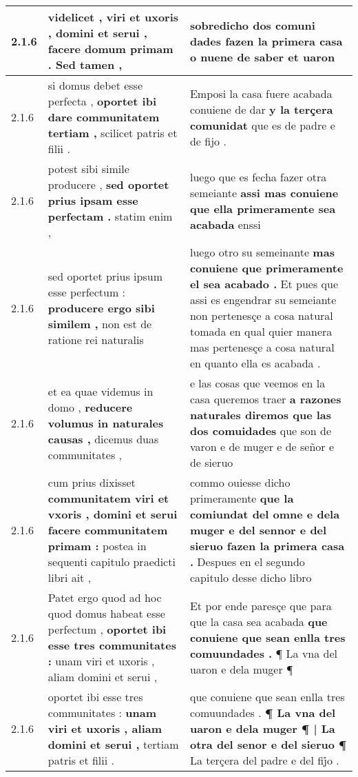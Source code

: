 \begin{tabular}{|p{1cm}|p{6.5cm}|p{6.5cm}|}
2.1.6 & videlicet , viri et uxoris , domini et serui , \textbf{ facere domum primam . } Sed tamen , & sobredicho dos comuni dades \textbf{ fazen la primera casa } o nuene de saber et uaron \\\hline
2.1.6 & si domus debet esse perfecta , \textbf{ oportet ibi dare communitatem tertiam , } scilicet patris et filii . & Emposi la casa fuere acabada conuiene de dar \textbf{ y la terçera comunidat } que es de padre e de fijo . \\\hline
2.1.6 & potest sibi simile producere , \textbf{ sed oportet prius ipsam esse perfectam . } statim enim , & luego que es fecha fazer otra semeiante \textbf{ assi mas conuiene que ella primeramente sea acabada } enssi \\\hline
2.1.6 & sed oportet prius ipsum esse perfectum : \textbf{ producere ergo sibi similem , } non est de ratione rei naturalis & luego otro su semeinante \textbf{ mas conuiene que primeramente el sea acabado . } Et pues que assi es engendrar su semeiante non pertenesçe a cosa natural tomada en qual quier manera mas pertenesçe a cosa natural en quanto ella es acabada . \\\hline
2.1.6 & et ea quae videmus in domo , \textbf{ reducere volumus in naturales causas , } dicemus duas communitates , & e las cosas que veemos en la casa queremos traer \textbf{ a razones naturales diremos que las dos comuidades } que son de varon e de muger e de señor e de sieruo \\\hline
2.1.6 & cum prius dixisset \textbf{ communitatem viri et vxoris , domini et serui facere communitatem primam : } postea in sequenti capitulo praedicti libri ait , & commo ouiesse dicho primeramente \textbf{ que la comiundat del omne e dela muger e del sennor e del sieruo fazen la primera casa . } Despues en el segundo capitulo desse dicho libro \\\hline
2.1.6 & Patet ergo quod ad hoc quod domus habeat esse perfectum , \textbf{ oportet ibi esse tres communitates : } unam viri et uxoris , aliam domini et serui , & Et por ende paresçe que para que la casa sea acabada \textbf{ que conuiene que sean enlla tres comuundades . } ¶ La vna del uaron e dela muger ¶ \\\hline
2.1.6 & oportet ibi esse tres communitates : \textbf{ unam viri et uxoris , aliam domini et serui , } tertiam patris et filii . & que conuiene que sean enlla tres comuundades . \textbf{ ¶ La vna del uaron e dela muger ¶ | La otra del senor e del sieruo ¶ } La terçera del padre e del fij̉o . \\\hline

\end{tabular}
